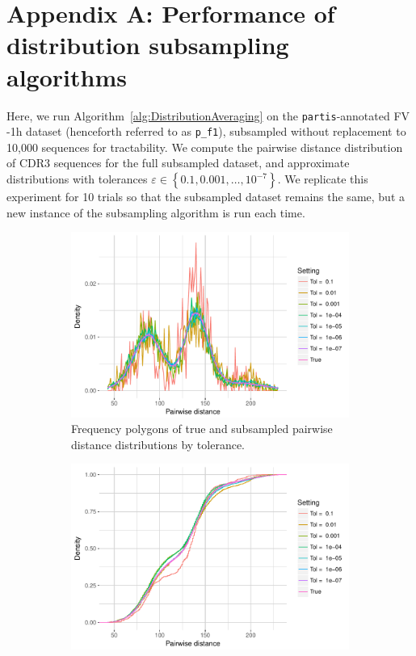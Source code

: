 \documentclass{article}
\newcommand{\partis}{\texttt{partis}}
\begin{document}
\section*{Appendix A: Performance of distribution subsampling algorithms}
Here, we run Algorithm~\ref{alg:DistributionAveraging} on the \partis-annotated FV -1h dataset (henceforth referred to as \texttt{p\_f1}), subsampled without replacement to 10,000 sequences for tractability.
We compute the pairwise distance distribution of CDR3 sequences for the full subsampled dataset, and approximate distributions with tolerances $\varepsilon \in \left\{0.1, 0.001, \dotsc, 10^{-7} \right\}$.
We replicate this experiment for 10 trials so that the subsampled dataset remains the same, but a new instance of the subsampling algorithm is run each time.
\begin{figure}
    \begin{subfigure}{.5\textwidth}
        \includegraphics[width=\linewidth]{Figures/PairwiseDistance/freqpoly_by_tol.pdf}
   		\caption{Frequency polygons of true and subsampled pairwise distance distributions by tolerance.}
    	\label{fig:FreqPoly}
    \end{subfigure}
    \begin{subfigure}{.5\textwidth}
        \includegraphics[width=\linewidth]{Figures/PairwiseDistance/ecdf_by_tol.pdf}

\end{subfigure}
\end{figure}
\end{document}
